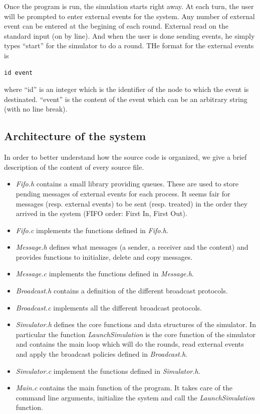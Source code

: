 \documentclass[a4paper]{article}
\begin{document}
Once the program is run, the simulation starts right away. At each turn, the
user will be prompted to enter external events for the system. Any number of
external event can be entered at the begining of each round. External read on
the standard input (on by line). And when the user is done sending events, he
simply types ``start'' for the simulator to do a round. THe format for the
external events is
\begin{lstlisting}
id event
\end{lstlisting}
where ``id'' is an integer which is the identifier of the node to which the
event is destinated. ``event'' is the content of the event which can be an
arbitrary string (with no line break).

\subsection{Architecture of the system}
In order to better understand how the source code is organized, we give a
brief description of the content of every source file.
\begin{itemize}
  \item \textit{Fifo.h} contains a small library providing queues. These are
        used to store pending messages of external events for each process.
        It seems fair for messages (resp. external events) to be sent (resp.
        treated) in the order they arrived in the system (FIFO order: First
        In, First Out).
  \item \textit{Fifo.c} implements the functions defined in \textit{Fifo.h}.
  \item \textit{Message.h} defines what messages (a sender, a receiver and the
        content) and provides functions to initialize, delete and copy
        messages.
  \item \textit{Message.c} implements the functions defined in
        \textit{Message.h}.
  \item \textit{Broadcast.h} contains a definition of the different broadcast
        protocols.
  \item \textit{Broadcast.c} implements all the different broadcast protocols.
  \item \textit{Simulator.h} defines the core functions and data structures
        of the simulator. In particular the function \textit{LaunchSimulation}
        is the core function of the simulator and contains the main loop which
        will do the rounds, read external events and apply the broadcast
        policies defined in \textit{Broadcast.h}.
  \item \textit{Simulator.c} implement the functions defined in
        \textit{Simulator.h}.
  \item \textit{Main.c} contains the main function of the program. It takes
        care of the command line arguments, initialize the system and call
        the \textit{LaunchSimulation} function.
\end{itemize}
\end{document}
